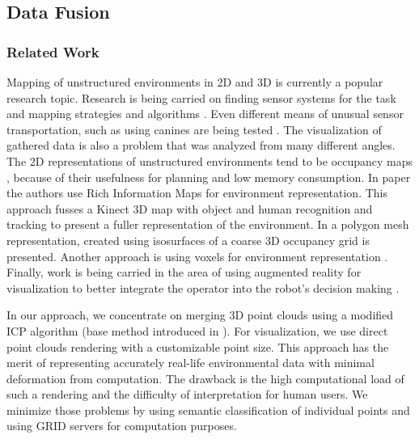 \documentclass{article}
\begin{document}
\subsection{Data Fusion}
\subsubsection{Related Work}
Mapping of unstructured environments in 2D and 3D is currently a popular research topic. Research is being carried on finding sensor systems for the task \cite{sensor2} and mapping strategies and algorithms \cite{method1}.
Even different means of unusual sensor transportation, such as using canines are being tested \cite{canine}.
The visualization of gathered data is also a problem that was analyzed from many different angles.
The 2D representations of unstructured environments tend to be occupancy maps \cite{ocmap1}\cite{ocmap2}, because of their usefulness for planning and low memory consumption.
In paper \cite{RIM} the authors use Rich Information Maps for environment representation.
This approach fusses a Kinect 3D map with object and human recognition and tracking to present a fuller representation of the environment. In \cite{isosurface} a polygon mesh representation, created using isosurfaces of a coarse 3D occupancy grid is presented.
Another approach is using voxels for environment representation \cite{voxels1}.
Finally, work is being carried in the area of using augmented reality for visualization to better integrate the operator into the robot's decision making \cite{AugmMap1}.


In our approach, we concentrate on merging 3D point clouds using a  modified ICP algorithm (base method introduced in \cite{baseICP}).
For visualization, we use direct point clouds rendering with a customizable point size.
This approach has the merit of representing accurately real-life environmental data with minimal deformation from computation.
The drawback is the high computational load of such a rendering and the difficulty of interpretation for human users.
We minimize those problems by using semantic classification of individual points and using GRID servers for computation purposes.
\end{document}
